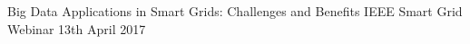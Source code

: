 \begin{cventries}
	\cvedu
	{Big Data Applications in Smart Grids: Challenges and Benefits} %
	{IEEE Smart Grid} %
	{Webinar} %
	{13th April 2017} %
\end{cventries}